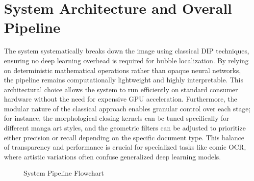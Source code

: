 \documentclass{article}
\begin{document}
\section{System Architecture and Overall Pipeline}
The system systematically breaks down the image using classical DIP techniques, ensuring no deep learning overhead is required for bubble localization. By relying on deterministic mathematical operations rather than opaque neural networks, the pipeline remains computationally lightweight and highly interpretable. This architectural choice allows the system to run efficiently on standard consumer hardware without the need for expensive GPU acceleration. Furthermore, the modular nature of the classical approach enables granular control over each stage; for instance, the morphological closing kernels can be tuned specifically for different manga art styles, and the geometric filters can be adjusted to prioritize either precision or recall depending on the specific document type. This balance of transparency and performance is crucial for specialized tasks like comic OCR, where artistic variations often confuse generalized deep learning models.

\begin{figure}[H]
    \centering
    \caption{System Pipeline Flowchart}
\end{figure}
\end{document}
